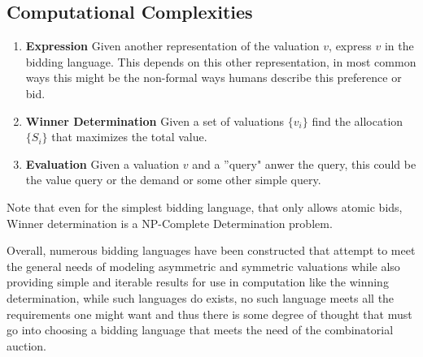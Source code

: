 \documentclass{article}
\begin{document}
\subsection{Computational Complexities}
\begin{enumerate}
    \item \textbf{Expression}
    Given another representation of the valuation \(v\), express \(v\) in the bidding language. This depends on this other representation, in most common ways this might be the non-formal ways humans describe this preference or bid. 
    \item \textbf{Winner Determination}
    Given a set of valuations \(\{v_i\}\) find the allocation \(\{S_i\}\) that maximizes the total value. 
    \item \textbf{Evaluation}   
    Given a valuation \(v\) and a ''query" anwer the query, this could be the value query or the demand or some other simple query.  
\end{enumerate}

Note that even for the simplest bidding language, that only allows atomic bids, Winner determination is a NP-Complete Determination problem. 

Overall, numerous bidding languages have been constructed that attempt to meet the general needs of modeling asymmetric and symmetric valuations while also providing simple and iterable results for use in computation like the winning determination, while such languages do exists, no such language meets all the requirements one might want and thus there is some degree of thought that must go into choosing a bidding language that meets the need of the combinatorial auction.
\end{document}
